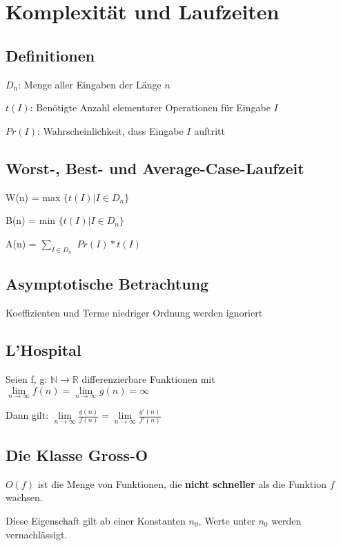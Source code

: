 \documentclass[12pt]{article}
\begin{document}
\parindent=0pt
\section{Komplexität und Laufzeiten}

\subsection{Definitionen}
$D_n$: Menge aller Eingaben der Länge $n$

$t(I)$: Benötigte Anzahl elementarer Operationen für Eingabe $I$

$Pr(I)$: Wahrscheinlichkeit, dass Eingabe $I$ auftritt

\subsection{Worst-, Best- und Average-Case-Laufzeit}

W(n) = max $\{ t(I) | I \in D_n \}$

B(n) = min $\{ t(I) | I \in D_n \}$

A(n) = $\sum_{I \in D_{n}}$ $Pr(I) * t(I)$

\subsection{Asymptotische Betrachtung}

Koeffizienten und Terme niedriger Ordnung werden ignoriert

\subsection{L'Hospital}

Seien f, g: $\mathbb{N} \to \mathbb{R}$ differenzierbare Funktionen mit \(\lim\limits_{n \to \infty}f(n)=\lim\limits_{n \to \infty}g(n)=\infty\)

Dann gilt: \(\lim\limits_{n \to \infty}\frac{g(n)}{f(n)}=\lim\limits_{n \to \infty}\frac{g'(n)}{f'(n)}\)

\subsection{Die Klasse Gross-O}

$O(f)$ ist die Menge von Funktionen, die \textbf{nicht schneller} als die Funktion $f$ wachsen.

Diese Eigenschaft gilt ab einer Konstanten $n_0$, Werte unter $n_0$ werden vernachlässigt.
\end{document}
